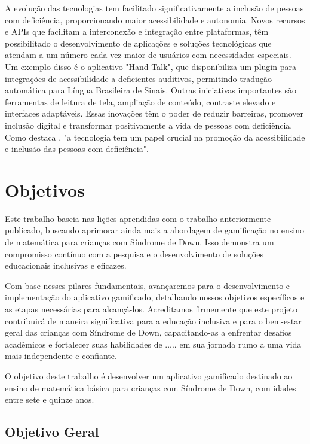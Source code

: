 A evolução das tecnologias tem facilitado significativamente a inclusão de pessoas com deficiência, proporcionando maior acessibilidade e autonomia. Novos recursos e APIs que facilitam a interconexão e integração entre plataformas, têm possibilitado o desenvolvimento de aplicações e soluções tecnológicas que atendam a um número cada vez maior de usuários com necessidades especiais. Um exemplo disso é o aplicativo "Hand Talk", que disponibiliza um plugin para integrações de acessibilidade a deficientes auditivos, permitindo tradução automática para Língua Brasileira de Sinais. Outras iniciativas importantes são ferramentas de leitura de tela, ampliação de conteúdo, contraste elevado e interfaces adaptáveis. Essas inovações têm o poder de reduzir barreiras, promover inclusão digital e transformar positivamente a vida de pessoas com deficiência. Como destaca  \cite{furlan2016desenvolvimento}, "a tecnologia tem um papel crucial na promoção da acessibilidade e inclusão das pessoas com deficiência".


\section{Objetivos}

Este trabalho baseia nas lições aprendidas com o trabalho \cite{2023gamificacao} anteriormente publicado, buscando aprimorar ainda mais a abordagem de gamificação no ensino de matemática para crianças com Síndrome de Down. Isso demonstra um compromisso contínuo com a pesquisa e o desenvolvimento de soluções educacionais inclusivas e eficazes.

Com base nesses pilares fundamentais, avançaremos para o desenvolvimento e implementação do aplicativo gamificado, detalhando nossos objetivos específicos e as etapas necessárias para alcançá-los. Acreditamos firmemente que este projeto contribuirá de maneira significativa para a educação inclusiva e para o bem-estar geral das crianças com Síndrome de Down, capacitando-as a enfrentar desafios acadêmicos e fortalecer suas habilidades de ..... em sua jornada rumo a uma vida mais independente e confiante.

O objetivo deste trabalho é desenvolver um aplicativo gamificado destinado ao ensino de matemática básica para crianças com Síndrome de Down, com idades entre sete e quinze anos.

\subsection{Objetivo Geral}

